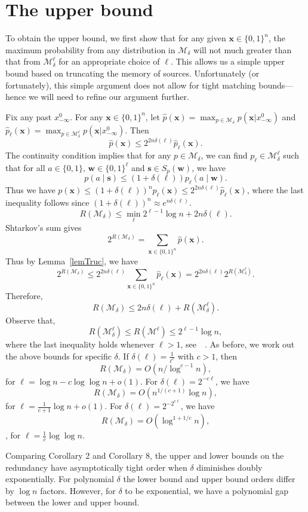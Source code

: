 \documentclass[conference,a4paper]{article}
\newcommand{\x}{\textbf{x}}
\newcommand{\w}{\textbf{w}}
\newcommand{\s}{\textbf{s}}
\newcommand{\M}{\mathcal{M}}
\begin{document}
\section{The upper bound}
\label{s:ub}
To obtain the upper bound, we first show that for any given
$\x\in \{0,1\}^{n}$, the maximum probability from any distribution in
$\M_{\delta}$ will not much greater than that from $\M_{\delta}^{\ell}$ 
for an appropriate choice of
$\ell$.  This allows us a simple upper bound based on truncating
the memory of sources. Unfortunately (or fortunately), this simple
argument does not allow for tight matching bounds---hence we will need
to refine our argument further.

\bLemma \label{lemTruc}Fix any past $x_{-\infty}^0$. For any $\x\in\{0,1\}^n$, let
$\hat{p}(\x)=\max_{p\in \M_{\delta}}p(\x|x_{-\infty}^0)$ and
$\hat{p}_{\ell}(\x)=\max_{p\in \M_{\delta}^{\ell}}p(\x|x_{-\infty}^0)$. Then
$$\hat{p}(\x)\le 2^{2n\delta(\ell)}\hat{p}_{\ell}(\x).$$
\Proof
The continuity condition implies that for any $p\in \M_{\delta}$, we can find $p_{\ell}\in \M_{\delta}^{\ell}$ such that for all $a\in \{0,1\}$, $\w\in\{0,1\}^{\ell}$ and $\s\in S_p(\w)$, we have
\[
p(a\mid \s)\le (1+\delta(\ell))p_{\ell}(a\mid \w).
\] 
Thus we have $p(\x)\le (1+\delta(\ell))^np_{\ell}(\x)\le 2^{2n\delta(\ell)}\hat{p}_{\ell}(\x)$, where the last inequality follows since $(1+\delta(\ell))^{n}\approx e^{n\delta(\ell)}$.
\eLemma 
\bProposition 
$$R(\M_{\delta})\le \min_{\ell} 2^{\ell-1}\log n+2n\delta(\ell).$$
\Proof
Shtarkov's sum \cite{shtar1987universal} gives
\[
2^{R(\M_{\delta})}=\sum_{\x\in\{0,1\}^n}\hat{p}(\x).
\]
Thus by Lemma~\ref{lemTruc}, we have
\[
2^{R(\M_{\delta})}\le 2^{2n\delta(\ell)}\sum_{\x\in\{0,1\}^n}\hat{p}_{\ell}(\x)=2^{2n\delta(\ell)}2^{R(\M_{\delta}^{\ell})}.
\]
Therefore,
\[
R(\M_{\delta})\le 2n\delta(\ell)+R(\M_{\delta}^{\ell}).
\]
Observe that,
\[
R(\M_{\delta}^{\ell})\le R(\M^{\ell})\le2^{\ell-1}\log n,
\]
where the last inequality holds whenever $\ell>1$, see~\eg~\cite{STW95}.
\eProposition
As before, we work out the above bounds for specific $\delta$.
\bCorollary
If $\delta(\ell)=\frac{1}{\ell^c}$ with $c>1$, then
\[
R(\M_{\delta}) = O(n/\log^{c-1}n),
\]
for $\ell=\log n-c\log \log n+o(1)$.
For $\delta(\ell)=2^{-c\ell}$, we have
\[
R(\M_{\delta})=O(n^{1/(c+1)}\log n),
\]
for $\ell=\frac{1}{c+1}\log n+o(1)$.
For $\delta(\ell)=2^{-2^{c\ell}}$, we have
\[
R(\M_{\delta})=O(\log^{1+1/c} n),
\], for $\ell=\frac{1}{c}\log\log n$.
\eCorollary

Comparing Corollary 2 and Corollary 8, the upper and lower bounds on
the redundancy have asymptotically tight order when $\delta$  
diminishes doubly exponentially. 
For polynomial $\delta$ the lower bound and upper bound orders
differ by $\log n$ factors. 
However, for $\delta$ to be exponential, we have a
polynomial gap between the lower and upper bound. 
\end{document}
